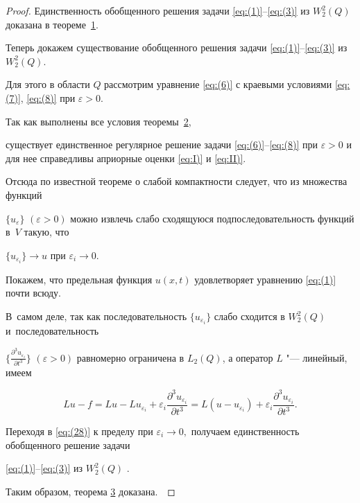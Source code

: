 \begin{proof}

Единственность обобщенного решения задачи \eqref{eq:(1)}--\eqref{eq:(3)} из $W_{2}^{2}(Q)$ доказана в теореме~\hyperlink{dzh:th1}{1}. 

Теперь докажем существование обобщенного решения задачи \eqref{eq:(1)}--\eqref{eq:(3)} из $W_{2}^{2}(Q)$. 

Для этого в области $Q$ рассмотрим  уравнение \eqref{eq:(6)} с краевыми условиями \eqref{eq:(7)}, \eqref{eq:(8)}  при $\varepsilon >0$. 

Так как выполнены все условия теоремы~\hyperlink{dzh:th2}{2}, 

существует единственное регулярное решение задачи \eqref{eq:(6)}--\eqref{eq:(8)} при $\varepsilon >0$ и для нее справедливы априорные оценки \eqref{eq:I)} и \eqref{eq:II)}. 

Отсюда по известной теореме о слабой компактности \cite{dzhamalov:10}  следует,  что из множества функций 

$ \{ u_\varepsilon \}$ $ (\varepsilon >0)$ можно извлечь слабо сходящуюся подпоследовательность функций в~$V$ такую, что  

$\{ u_{\varepsilon _i}\}\to u $ при $\varepsilon _i\to 0.$   

Покажем, что предельная функция $u(x,t)$ удовлетворяет уравнению \eqref{eq:(1)} почти всюду.  

В~самом деле, так как последовательность $\{ u_{\varepsilon _i}\}$ слабо сходится в $W_{2}^{2}(Q)$ и~последовательность 

$\bigl\{ \frac{\partial ^3 u_{\varepsilon _i}}{\partial t^3} \bigr\}$ $(\varepsilon >0)$ равномерно ограничена в ${{L}_{2}}(Q)$, а оператор $L$ "--- линейный, имеем

\begin{equation}

Lu-f=Lu-Lu_{\varepsilon _i} + 

\varepsilon _i \frac{ \partial ^3 u _{\varepsilon _i}} {\partial t^3}=

L(u-u_{\varepsilon _i})+ \varepsilon _i 

\frac{\partial ^3 u_ {\varepsilon _i }}{\partial t^3}.

\label{eq:(28)}

\end{equation}

Переходя в \eqref{eq:(28)} к пределу при $\varepsilon _i\to 0,$ получаем единственность обобщенного решение задачи

\eqref{eq:(1)}--\eqref{eq:(3)} из $W_{2}^{2}(Q)$ \cite{dzhamalov:2, dzhamalov:10}. %

Таким образом, теорема \hyperlink{dzh:th3}{3} доказана.~\end{proof}



